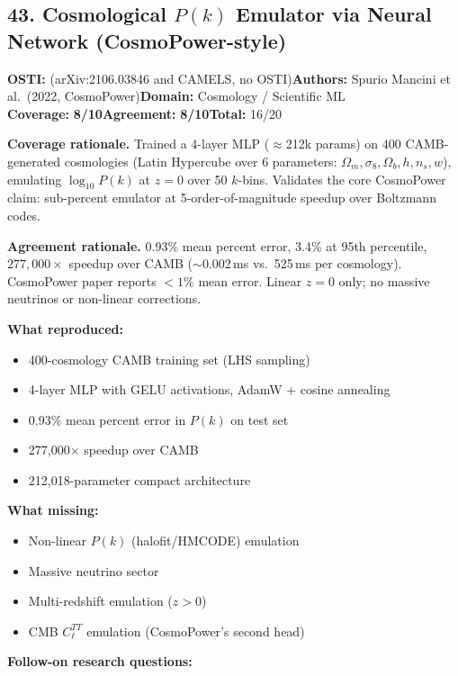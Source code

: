 \documentclass[11pt]{article}
\newcommand{\scorebadge}[2]{\textbf{#1:} \textbf{#2/10}}
\begin{document}
\subsection{43. Cosmological $P(k)$ Emulator via Neural Network (CosmoPower-style)}
\textbf{OSTI:} (arXiv:2106.03846 and CAMELS, no OSTI)\quad\textbf{Authors:} Spurio Mancini et al.\ (2022, CosmoPower)\quad\textbf{Domain:} Cosmology / Scientific ML\\
\scorebadge{Coverage}{8}\quad\scorebadge{Agreement}{8}\quad\textbf{Total:} 16/20\par\smallskip
\noindent\textbf{Coverage rationale.} Trained a 4-layer MLP ($\approx$212k params) on 400 CAMB-generated cosmologies (Latin Hypercube over 6 parameters: $\Omega_m, \sigma_8, \Omega_b, h, n_s, w$), emulating $\log_{10} P(k)$ at $z=0$ over 50 $k$-bins. Validates the core CosmoPower claim: sub-percent emulator at 5-order-of-magnitude speedup over Boltzmann codes.\par
\noindent\textbf{Agreement rationale.} 0.93\% mean percent error, 3.4\% at 95th percentile, $277,\!000\times$ speedup over CAMB ($\sim$0.002\,ms vs.\ 525\,ms per cosmology). CosmoPower paper reports $<1\%$ mean error. Linear $z=0$ only; no massive neutrinos or non-linear corrections.\par\smallskip
\noindent\textbf{What reproduced:}
\begin{itemize}[leftmargin=1.4em,itemsep=0.2em,topsep=0.2em]
\item 400-cosmology CAMB training set (LHS sampling)
\item 4-layer MLP with GELU activations, AdamW + cosine annealing
\item 0.93\% mean percent error in $P(k)$ on test set
\item 277,000$\times$ speedup over CAMB
\item 212,018-parameter compact architecture
\end{itemize}
\noindent\textbf{What missing:}
\begin{itemize}[leftmargin=1.4em,itemsep=0.2em,topsep=0.2em]
\item Non-linear $P(k)$ (halofit/HMCODE) emulation
\item Massive neutrino sector
\item Multi-redshift emulation ($z>0$)
\item CMB $C_\ell^{TT}$ emulation (CosmoPower's second head)
\end{itemize}
\noindent\textbf{Follow-on research questions:}
\end{document}
